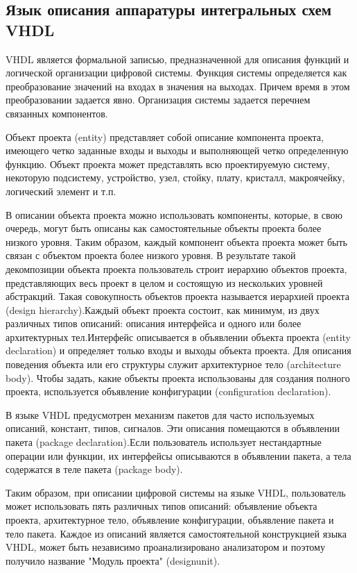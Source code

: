 \subsection{Язык описания аппаратуры интегральных схем VHDL}
\label{sub:practice:vhdl_overview}
VHDL является формальной записью, предназначенной для описания функций и логической организации цифровой системы. Функция системы определяется как преобразование значений на входах в значения на выходах. Причем время в этом преобразовании задается явно. Организация системы задается перечнем связанных компонентов.

Объект проекта (entity) представляет собой описание компонента проекта, имеющего четко заданные входы и выходы и выполняющей четко определенную функцию. Объект проекта может представлять всю проектируемую систему, некоторую подсистему, устройство, узел, стойку, плату, кристалл, макроячейку, логический элемент и т.п.

В описании объекта проекта можно использовать компоненты, которые, в свою очередь, могут быть описаны как самостоятельные объекты проекта более низкого уровня. Таким образом, каждый компонент объекта проекта может быть связан с объектом проекта более низкого уровня. В результате такой декомпозиции объекта проекта пользователь строит иерархию объектов проекта, представляющих весь проект в целом и состоящую из нескольких уровней абстракций. Такая совокупность объектов проекта называется иерархией проекта (design hierarchy).Каждый объект проекта состоит, как минимум, из двух различных типов описаний: описания интерфейса и одного или более архитектурных тел.Интерфейс описывается в объявлении объекта проекта  (entity declaration)  и определяет только входы и выходы объекта проекта. Для описания поведения объекта или его структуры служит архитектурное тело (architecture body). Чтобы задать, какие объекты проекта использованы для создания полного проекта, используется объявление конфигурации (configuration declaration).

В языке VHDL  предусмотрен механизм пакетов для часто используемых описаний, констант, типов, сигналов. Эти описания помещаются в объявлении пакета (package declaration).Если пользователь использует нестандартные операции или функции, их интерфейсы описываются в объявлении пакета, а тела содержатся в теле пакета (package body).

Таким образом, при описании цифровой системы на языке VHDL,  пользователь может использовать пять различных типов описаний: объявление объекта проекта, архитектурное тело, объявление конфигурации, объявление пакета и тело пакета. Каждое из описаний является самостоятельной конструкцией языка  VHDL, может быть независимо проанализировано анализатором и поэтому получило название "Модуль проекта" (designunit).

